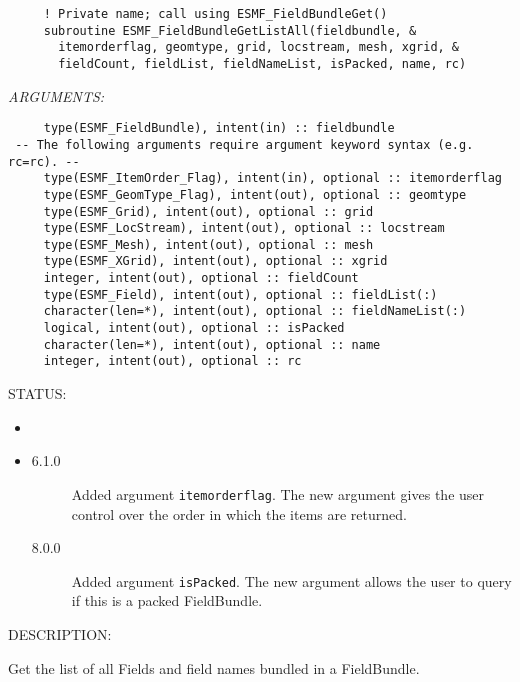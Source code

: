   
\begin{verbatim}     ! Private name; call using ESMF_FieldBundleGet()
     subroutine ESMF_FieldBundleGetListAll(fieldbundle, &
       itemorderflag, geomtype, grid, locstream, mesh, xgrid, &
       fieldCount, fieldList, fieldNameList, isPacked, name, rc)\end{verbatim}{\em ARGUMENTS:}
\begin{verbatim}     type(ESMF_FieldBundle), intent(in) :: fieldbundle
 -- The following arguments require argument keyword syntax (e.g. rc=rc). --
     type(ESMF_ItemOrder_Flag), intent(in), optional :: itemorderflag
     type(ESMF_GeomType_Flag), intent(out), optional :: geomtype
     type(ESMF_Grid), intent(out), optional :: grid
     type(ESMF_LocStream), intent(out), optional :: locstream
     type(ESMF_Mesh), intent(out), optional :: mesh
     type(ESMF_XGrid), intent(out), optional :: xgrid
     integer, intent(out), optional :: fieldCount
     type(ESMF_Field), intent(out), optional :: fieldList(:)
     character(len=*), intent(out), optional :: fieldNameList(:)
     logical, intent(out), optional :: isPacked
     character(len=*), intent(out), optional :: name
     integer, intent(out), optional :: rc\end{verbatim}
{\sf STATUS:}
   \begin{itemize}
   \item{}
   \item{}
   \begin{description}
   \item[6.1.0] Added argument {\tt itemorderflag}.
   The new argument gives the user control over the order in which
   the items are returned.
   \item[8.0.0] Added argument {\tt isPacked}.
   The new argument allows the user to query if this is a packed FieldBundle.
   \end{description}
   \end{itemize}
  
{\sf DESCRIPTION:\\ }


   Get the list of all Fields and field names bundled in a FieldBundle.
  
